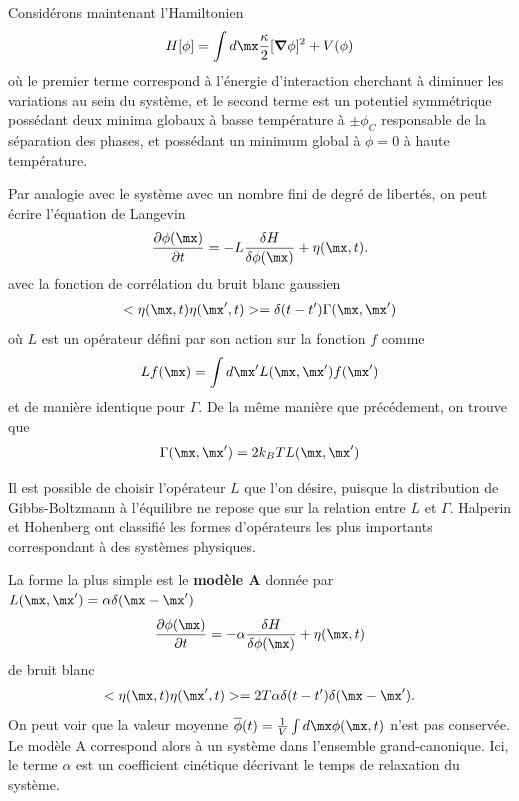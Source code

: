 Considérons maintenant l'Hamiltonien 
\begin{align}
    H[\phi] = \int d \mx  \frac{\kappa}{2}[{\boldsymbol \nabla} \phi]^2 + V(\phi)
    \label{hamil-mean-field}
\end{align}
où le premier terme correspond à l'énergie d'interaction cherchant à diminuer les variations au sein du système, et le second terme est un potentiel symmétrique possédant deux minima globaux à basse température à $\pm \phi_C$ responsable de la séparation des phases, et possédant un minimum global à $\phi = 0$ à haute température. 

Par analogie avec le système avec un nombre fini de degré de libertés, on peut écrire l'équation de Langevin 
\begin{align}
    \frac{\partial \phi(\mx)}{\partial t}= -L \frac{\delta H}{\delta \phi(\mx)} + \eta(\mx,t).
\end{align}
avec la fonction de corrélation du bruit blanc gaussien
\begin{align}
    < \eta(\mx,t)\eta(\mx',t)> =\delta(t-t')\Gamma(\mx,\mx')
\end{align}
où  $L$ est un opérateur défini par son action sur la fonction $f$ comme
\begin{align}
    L f(\mx) = \int d\mx' L(\mx,\mx')f(\mx')
\end{align}
et de manière identique pour $\Gamma$.
De la même manière que précédement, on trouve que 
\begin{align} 
    \Gamma(\mx,\mx') =2 k_B T L(\mx,\mx')
\end{align}

Il est possible de choisir l'opérateur $L$ que l'on désire, puisque la distribution de Gibbs-Boltzmann à l'équilibre ne repose que sur la relation entre $L$ et $\Gamma$. 
Halperin et Hohenberg \cite{hohenberg_theory_1977} ont classifié les formes d'opérateurs les plus importants correspondant à des systèmes physiques.

La forme la plus simple est le \textbf{modèle A} donnée par $L(\mx,\mx')=\alpha\delta(\mx-\mx')$ 
\begin{align}
    \frac{\partial \phi(\mx)}{\partial t}= -\alpha \frac{\delta H}{\delta \phi(\mx)} + \eta(\mx,t)
    \label{MA}
\end{align}
de bruit blanc
\begin{align}
    < \eta(\mx,t)\eta(\mx',t)> =2T \alpha \delta(t-t')\delta(\mx-\mx').
\end{align}
On peut voir que la valeur moyenne $\overline \phi(t) = \frac{1}{V}\int d\mx \phi(\mx,t)$ n'est pas conservée. Le modèle A correspond alors à un système dans l'ensemble grand-canonique. Ici, le terme $\alpha$ est un coefficient cinétique décrivant le temps de relaxation du système. 

